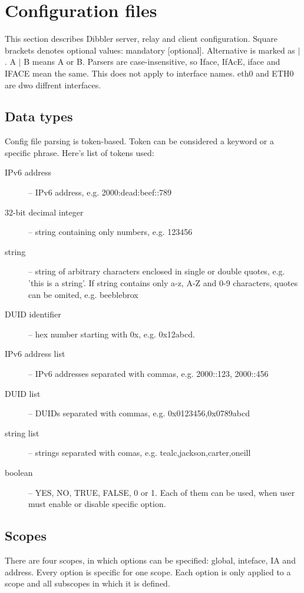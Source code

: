 
\section{Configuration files}

This section describes Dibbler server, relay  and client
configuration. Square brackets denotes optional values: mandatory
[optional]. Alternative is marked as $\mid$. A $\mid$ B means A or
B. Parsers are case-insensitive, so Iface, IfAcE, iface and IFACE mean
the same. This does not apply to interface names. eth0 and
ETH0 are dwo diffrent interfaces.

\subsection{Data types}
Config file parsing is token-based. Token can be considered a keyword
or a specific phrase. Here's list of tokens used:
\begin{description}
\item[IPv6 address] -- IPv6 address, e.g. 2000:dead:beef::789
\item[32-bit decimal integer] -- string containing only numbers, e.g. 123456
\item[string] -- string of arbitrary characters enclosed in single or double
  quotes, e.g. 'this is a string'. If string contains only a-z, A-Z and
  0-9 characters, quotes can be omited, e.g. beeblebrox
\item[DUID identifier] -- hex number starting with 0x, e.g. 0x12abcd.
\item[IPv6 address list] -- IPv6 addresses separated with commas,
	   e.g. 2000::123, 2000::456
\item[DUID list] -- DUIDs separated with commas, e.g. 0x0123456,0x0789abcd
\item[string list] -- strings separated with comas, e.g. tealc,jackson,carter,oneill
\item[boolean] -- YES, NO, TRUE, FALSE, 0 or 1. Each of them can be
  used, when user must enable or disable specific option.
\end{description}

\subsection{Scopes}
There are four scopes, in which options can be specified: global,
inteface, IA and address. Every option is specific for one scope.
Each option is only applied to a scope and all subscopes in which it is
defined.

